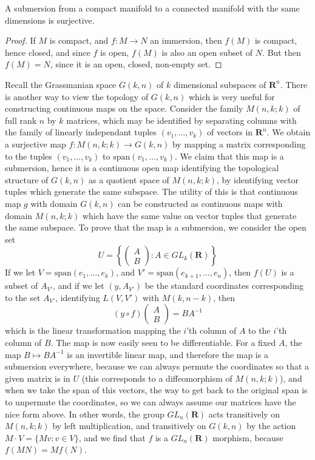 \begin{corollary}
    A submersion from a compact manifold to a connected manifold with the same dimensions is surjective.
\end{corollary}
\begin{proof}
    If $M$ is compact, and $f: M \to N$ an immersion, then $f(M)$ is compact, hence closed, and since $f$ is open, $f(M)$ is also an open subset of $N$. But then $f(M) = N$, since it is an open, closed, non-empty set.
\end{proof}

\begin{example}
    Recall the Grassmanian space $G(k,n)$ of $k$ dimensional subspaces of $\mathbf{R}^n$. There is another way to view the topology of $G(k,n)$ which is very useful for constructing continuous maps on the space. Consider the family $M(n,k;k)$ of full rank $n$ by $k$ matrices, which may be identified by separating columns with the family of linearly independant tuples $(v_1, \dots, v_k)$ of vectors in $\mathbf{R}^n$. We obtain a surjective map $f: M(n,k;k) \to G(k,n)$ by mapping a matrix corresponding to the tuples $(v_1, \dots, v_k)$ to $\text{span}(v_1, \dots, v_k)$. We claim that this map is a submersion, hence it is a continuous open map identifying the topological structure of $G(k,n)$ as a quotient space of $M(n,k;k)$, by identifying vector tuples which generate the same subspace. The utility of this is that continuous map $g$ with domain $G(k,n)$ can be constructed as continuous maps with domain $M(n,k;k)$ which have the same value on vector tuples that generate the same subspace. To prove that the map is a submersion, we consider the open set
    \[ U = \left\{ \begin{pmatrix} A \\ B \end{pmatrix}: A \in GL_k(\mathbf{R}) \right\} \]
    If we let $V = \text{span}(e_1, \dots, e_k)$, and $V' = \text{span}(e_{k+1}, \dots, e_n)$, then $f(U)$ is a subset of $A_{V'}$, and if we let $(y,A_{V'})$ be the standard coordinates corresponding to the set $A_{V'}$, identifying $L(V,V')$ with $M(k,n-k)$, then
    \[ (y \circ f) \begin{pmatrix} A \\ B \end{pmatrix} = BA^{-1} \]
    which is the linear transformation mapping the $i$'th column of $A$ to the $i$'th column of $B$. The map is now easily seen to be differentiable. For a fixed $A$, the map $B \mapsto BA^{-1}$ is an invertible linear map, and therefore the map is a submersion everywhere, because we can always permute the coordinates so that a given matrix is in $U$ (this corresponds to a diffeomorphism of $M(n,k;k)$), and when we take the span of this vectors, the way to get back to the original span is to unpermute the coordinates, so we can always assume our matrices have the nice form above. In other words, the group $GL_n(\mathbf{R})$ acts transitively on $M(n,k;k)$ by left multiplication, and transitively on $G(k,n)$ by the action $M \cdot V = \{ Mv : v \in V \}$, and we find that $f$ is a $GL_n(\mathbf{R})$ morphism, because $f(MN) = Mf(N)$.
\end{example}


